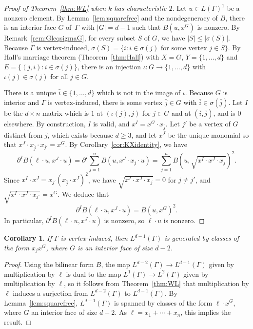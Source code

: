 \documentclass[11pt]{article}
\newtheorem{coro}[theo]{Corollary}
\theoremstyle{definition}
\numberwithin{equation}{section}
\numberwithin{equation}{section}
\begin{document}
\begin{proof}[Proof of Theorem~\ref{thm:WL} when $k$ has characteristic $2$]
Let $u \in L(\Gamma)^1$ be a nonzero element. By Lemma~\ref{lem:squarefree} and the nondegeneracy of $B$, there is an interior face $G$ of~$\Gamma$ with $|G| = d-1$ such that $B(u, x^G)$ is nonzero. 
By Remark~\ref{rem:GleqsigmaG},
for every subset $S$ of $G$,  we have $|S| \le |\sigma(S)|$.
Because $\Gamma$ is vertex-induced, $\sigma(S) = \{ i : i \in \sigma(j) \textrm{ for some vertex } j \in S \}$.  
By Hall's marriage theorem (Theorem~\ref{thm:Hall})
with $X = G$, $Y = \{ 1,\ldots,d\}$ and $E = \{ (j,i) : i \in \sigma(j)\}$,
there is an injection $\iota \colon G \to \{1, \dotsc, d\}$ with $\iota(j) \in \sigma(j)$ for all $j \in G$. 


There is a unique $\bar{i} \in \{1, \dotsc, d\}$ which is not in the image of $\iota$. Because $G$ is interior and $\Gamma$ is vertex-induced, there is some vertex $\bar{j} \in G$ with $\bar{i} \in \sigma(\bar{j})$. Let $I$ be the $d \times n$ matrix which is $1$ at $(\iota(j), j)$ for $j \in G$ and at $(\bar{i}, \bar{j})$, and is $0$ elsewhere. By construction, $I$ is valid, and $x^I = x^G \cdot x_{\bar{j}}$. 
Let $j'$ be a vertex of $G$ distinct from $\bar{j}$, which exists because $d \ge 3$, and let $x^J$ be the unique monomial so that $x^J \cdot x_{\bar{j}} \cdot x_{j'} = x^G$. By Corollary~\ref{cor:KXidentity}, we have
$$\partial^I B(\ell \cdot u, x^J \cdot u) = \partial^I \sum_{j=1}^{n} B(u , x^J \cdot x_j \cdot u  ) = \sum_{j=1}^{n} B(u, \sqrt{x^I \cdot x^J \cdot x_j})^2.$$
Since $x^I \cdot x^J = x_{j'} (x_{\bar{j}} \cdot x^J)^2$, we have $\sqrt{x^I \cdot x^J \cdot x_j}  = 0$ for $j \neq j'$,  
and $\sqrt{x^I \cdot x^J \cdot x_{j'}} = x^G$. We deduce that
$$\partial^I B(\ell \cdot u,  x^J \cdot u) = B(u, x^G)^2.$$
In particular, $\partial^I B( \ell \cdot u, x^J \cdot u)$ is nonzero, so $\ell \cdot u$ is nonzero. 
\end{proof}

\begin{coro}\label{cor:dminus1gen}
If $\Gamma$ is vertex-induced, then $L^{d-1}(\Gamma)$ is generated by classes of the form $x_j x^G$, where $G$ is an interior face of size $d-2$. 
\end{coro}

\begin{proof}
Using the bilinear form $B$, the map $L^{d-2}(\Gamma) \to L^{d-1}(\Gamma)$ given by multiplication by $\ell$ is dual to the map $L^1(\Gamma) \to L^2(\Gamma)$ given by multiplication by $\ell$, so it follows from Theorem~\ref{thm:WL} that multiplication by $\ell$ induces a surjection from $L^{d-2}(\Gamma)$ to $L^{d-1}(\Gamma)$. By Lemma~\ref{lem:squarefree}, $L^{d-1}(\Gamma)$ is spanned by classes of the form $\ell \cdot x^G$, where $G$ an interior face of size $d-2$. As $\ell = x_1 + \dotsb + x_n$, this implies the result. 
\end{proof}
\end{document}
